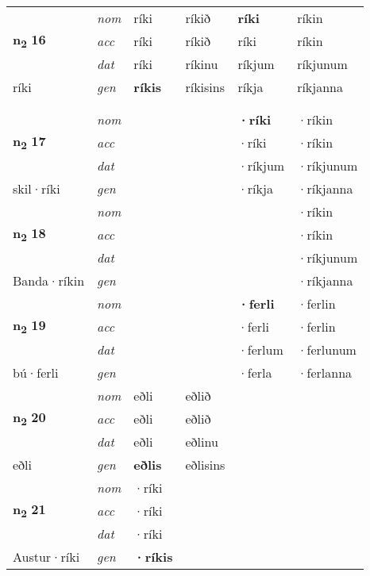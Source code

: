\begin{longtable}[l]{X>{\footnotesize\itshape}XXXXX}
\multirow{3}{*}{{{\textbf{n{\textsubscript{2}}} \Large{\textbf{16}}}}} & nom & ríki & ríkið & \textbf{ríki} & ríkin \\*
 & acc & ríki & ríkið & ríki & ríkin \\*
 & dat & ríki & ríkinu & ríkjum & ríkjunum \\*
 {\footnotesize{ríki}} & gen & \textbf{ríkis} & ríkisins & ríkja & ríkjanna \\*
 & &  &  &  &  \\*
 & &  &  &  &  \\
 
\multirow{3}{*}{{{\textbf{n{\textsubscript{2}}} \Large{\textbf{17}}}}} & nom &  &  & \textbf{·ríki} & ·ríkin \\*
 & acc &  &  & ·ríki & ·ríkin \\*
 & dat &  &  & ·ríkjum & ·ríkjunum \\*
 {\footnotesize{skil\allowbreak ·ríki}} & gen & \textbf{} &  & ·ríkja & ·ríkjanna \\
\cmidrule{1-6}

\multirow{3}{*}{{{\textbf{n{\textsubscript{2}}} \Large{\textbf{18}}}}} & nom &  &  & \textbf{} & ·ríkin \\*
 & acc &  &  &  & ·ríkin \\*
 & dat &  &  &  & ·ríkjunum \\*
 {\footnotesize{Banda\allowbreak ·ríkin}} & gen & \textbf{} &  &  & ·ríkjanna \\
\cmidrule{1-6}

\multirow{3}{*}{{{\textbf{n{\textsubscript{2}}} \Large{\textbf{19}}}}} & nom &  &  & \textbf{·ferli} & ·ferlin \\*
 & acc &  &  & ·ferli & ·ferlin \\*
 & dat &  &  & ·ferlum & ·ferlunum \\*
 {\footnotesize{bú\allowbreak ·ferli}} & gen & \textbf{} &  & ·ferla & ·ferlanna \\
\cmidrule{1-6}

\multirow{3}{*}{{{\textbf{n{\textsubscript{2}}} \Large{\textbf{20}}}}} & nom & eðli & eðlið & \textbf{} &  \\*
 & acc & eðli & eðlið &  &  \\*
 & dat & eðli & eðlinu &  &  \\*
 {\footnotesize{eðli}} & gen & \textbf{eðlis} & eðlisins &  &  \\
\cmidrule{1-6}

\multirow{3}{*}{{{\textbf{n{\textsubscript{2}}} \Large{\textbf{21}}}}} & nom & ·ríki &  & \textbf{} &  \\*
 & acc & ·ríki &  &  &  \\*
 & dat & ·ríki &  &  &  \\*
 {\footnotesize{Austur\allowbreak ·ríki}} & gen & \textbf{·ríkis} &  &  &  \\
\cmidrule{1-6}


\end{longtable}
